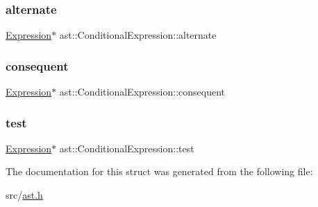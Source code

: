 \subsubsection{\texorpdfstring{alternate}{alternate}}
{\footnotesize\ttfamily \hyperlink{structast_1_1_expression}{Expression}$\ast$ ast\+::\+Conditional\+Expression\+::alternate}

\mbox{\label{structast_1_1_conditional_expression_a156bf0acbb9f51a660cd8270fd5fceea}} 
\subsubsection{\texorpdfstring{consequent}{consequent}}
{\footnotesize\ttfamily \hyperlink{structast_1_1_expression}{Expression}$\ast$ ast\+::\+Conditional\+Expression\+::consequent}

\mbox{\label{structast_1_1_conditional_expression_ae45a4e413943196c548657c3259dafa5}} 
\subsubsection{\texorpdfstring{test}{test}}
{\footnotesize\ttfamily \hyperlink{structast_1_1_expression}{Expression}$\ast$ ast\+::\+Conditional\+Expression\+::test}



The documentation for this struct was generated from the following file\+:\begin{DoxyCompactItemize}
\item 
src/\hyperlink{ast_8h}{ast.\+h}\end{DoxyCompactItemize}
